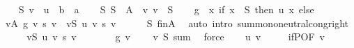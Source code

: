 \begin{isabellebody}
\ \ \isamarkupfalse%
\ S\ v\ \ u\ {\isacharcolon}{\kern0pt}{\isacharcolon}{\kern0pt}\ {\isachardoublequoteopen}{\isacharprime}{\kern0pt}b\ {\isasymRightarrow}\ {\isacharprime}{\kern0pt}a{\isachardoublequoteclose}\isanewline
\ \ \isamarkupfalse%
\ S{\isacharcolon}{\kern0pt}\ {\isachardoublequoteopen}S\ {\isasymsubseteq}\ A{\isachardoublequoteclose}\ \ v{\isacharcolon}{\kern0pt}\ {\isachardoublequoteopen}v\ {\isasymin}\ S{\isachardoublequoteclose}\isanewline
\ \ \isamarkupfalse%
\ {\isacharquery}{\kern0pt}g\ {\isacharequal}{\kern0pt}\ {\isachardoublequoteopen}{\isasymlambda}x{\isachardot}{\kern0pt}\ if\ x\ {\isasymin}\ S\ then\ u\ x\ else\ {}{\isachardoublequoteclose}\isanewline
\ \ \isamarkupfalse%
\ {\isachardoublequoteopen}{\isacharparenleft}{\kern0pt}{\isasymSum}v{\isasymin}A{\isachardot}{\kern0pt}\ {\isacharquery}{\kern0pt}g\ v\ {\isacharasterisk}{\kern0pt}s\ v{\isacharparenright}{\kern0pt}\ {\isacharequal}{\kern0pt}\ {\isacharparenleft}{\kern0pt}{\isasymSum}v{\isasymin}S{\isachardot}{\kern0pt}\ u\ v\ {\isacharasterisk}{\kern0pt}s\ v{\isacharparenright}{\kern0pt}{\isachardoublequoteclose}\isanewline
\ \ \ \ \isamarkupfalse%
\ S\ fin{\isacharunderscore}{\kern0pt}A\ \isamarkupfalse%
\ {\isacharparenleft}{\kern0pt}auto\ intro{\isacharbang}{\kern0pt}{\isacharcolon}{\kern0pt}\ sum{\isachardot}{\kern0pt}mono{\isacharunderscore}{\kern0pt}neutral{\isacharunderscore}{\kern0pt}cong{\isacharunderscore}{\kern0pt}right{\isacharparenright}{\kern0pt}\isanewline
\ \ \isamarkupfalse%
\ \isamarkupfalse%
\ {\isachardoublequoteopen}{\isacharparenleft}{\kern0pt}{\isasymSum}v{\isasymin}S{\isachardot}{\kern0pt}\ u\ v\ {\isacharasterisk}{\kern0pt}s\ v{\isacharparenright}{\kern0pt}\ {\isacharequal}{\kern0pt}\ {}{\isachardoublequoteclose}\isanewline
\ \ \isamarkupfalse%
\ \isamarkupfalse%
\ {\isachardoublequoteopen}{\isacharquery}{\kern0pt}g\ v\ {\isacharequal}{\kern0pt}\ {}{\isachardoublequoteclose}\ \isamarkupfalse%
\ v\ S\ sum\ \isamarkupfalse%
\ force\isanewline
\ \ \isamarkupfalse%
\ {\isachardoublequoteopen}u\ v\ {\isacharequal}{\kern0pt}\ {}{\isachardoublequoteclose}\ \ \isamarkupfalse%
\ if{\isacharunderscore}{\kern0pt}P{\isacharbrackleft}{\kern0pt}OF\ v{\isacharbrackright}{\kern0pt}\ \isacommand{{\isachardot}{\kern0pt}}\isamarkupfalse%
\isanewline

\end{isabellebody}
